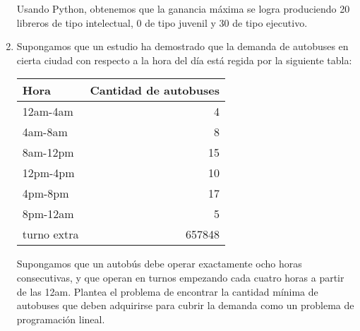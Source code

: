 \documentclass[twocolumn]{article}
\begin{document}
\begin{enumerate}
Usando Python, obtenemos que la ganancia máxima se logra produciendo 20 libreros de tipo intelectual, 0 de tipo juvenil y 30 de tipo ejecutivo. 


\item Supongamos que un estudio ha demostrado que la demanda de autobuses
en cierta ciudad con respecto a la hora del día está regida por la
siguiente tabla:
\begin{center}
\begin{tabular}{lr}
Hora & Cantidad de autobuses\\
\hline
12am-4am & 4\\
4am-8am & 8\\
8am-12pm & 15\\
12pm-4pm & 10\\
4pm-8pm & 17\\
8pm-12am & 5\\
turno extra & 657848\\
\end{tabular}
\end{center}

Supongamos que un autobús debe operar exactamente ocho horas
consecutivas, y que operan en turnos empezando cada cuatro horas a
partir de las 12am. Plantea el problema de encontrar la cantidad
mínima de autobuses que deben adquirirse para cubrir la
demanda como un problema de programación lineal.
\end{enumerate}
\end{document}
